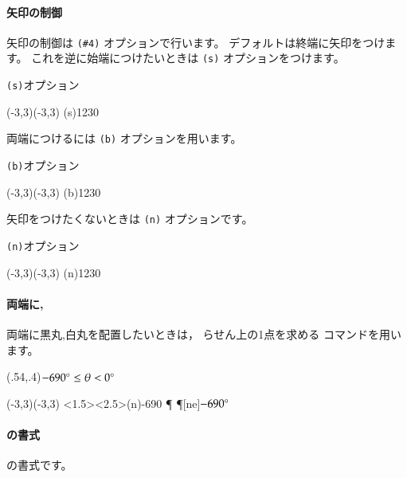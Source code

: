 \paragraph{矢印の制御}
矢印の制御は \verb/(#4)/ オプションで行います。
デフォルトは終端に矢印をつけます。
これを逆に始端につけたいときは \verb/(s)/ オプションをつけます。
\begin{showEx}{\texttt{(s)}オプション}
\small
\begin{zahyou}(-3,3)(-3,3)%
\ippankaku(s){1230}%
%
\end{zahyou}
\end{showEx}
\bigskip

両端につけるには \verb/(b)/ オプションを用います。
\begin{showEx}{\texttt{(b)}オプション}
\small
\begin{zahyou}(-3,3)(-3,3)%
\ippankaku(b){1230}%
%
\end{zahyou}
\end{showEx}
\bigskip

矢印をつけたくないときは \verb/(n)/ オプションです。
\begin{showEx}{\texttt{(n)}オプション}
\small
\begin{zahyou}(-3,3)(-3,3)%
\ippankaku(n){1230}%
%
\end{zahyou}
\end{showEx}
\bigskip

\paragraph{両端に, }
両端に黒丸,白丸を配置したいときは，
らせん上の1点を求める  コマンドを用います。
\begin{showEx}(.54,.4){$-690^{\circ}\leq \theta<0^{\circ}$}
\small
\begin{zahyou*}[ul=8mm](-3,3)(-3,3)%
\drawXYaxis
\ippankaku<1.5><2.5>(n){-690}%
%
\Start\Siromaru\Start
{}\End\Kuromaru\End
{}\P
\Put\P[ne]{$-690^{\circ}$}%
\end{zahyou*}
\end{showEx}

\paragraph{ の書式}
 の書式です。


